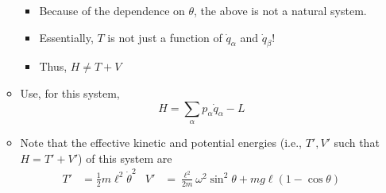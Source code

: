 \documentclass[../notes.tex]{subfiles}
\begin{document}
\begin{itemize}
\begin{itemize}
\begin{equation*}
        \end{equation*}
        \begin{itemize}
            \item Because of the dependence on $\theta$, the above is not a natural system.
            \item Essentially, $T$ is not just a function of $\dot{q}_\alpha$ and $\dot{q}_\beta$!
            \item Thus, $H\neq T+V$
        \end{itemize}
        \item Use, for this system,
        \begin{equation*}
            H = \sum_\alpha p_\alpha\dot{q}_\alpha-L
        \end{equation*}
        \item Note that the effective kinetic and potential energies (i.e., $T',V'$ such that $H=T'+V'$) of this system are
        \begin{align*}
            T' &= \frac{1}{2}m\ell^2\dot{\theta}^2&
            V' &= \frac{\ell^2}{2m}\omega^2\sin^2\theta+mg\ell(1-\cos\theta)
        \end{align*}
    \end{itemize}
\end{itemize}
\end{document}
